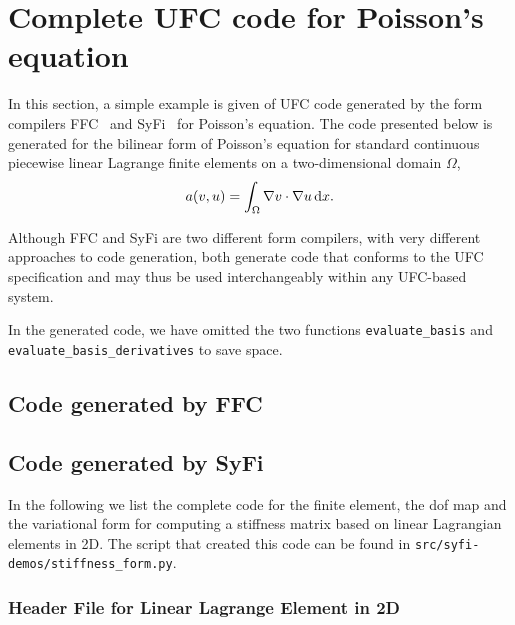 \chapter{Complete UFC code for Poisson's equation}

In this section, a simple example is given of UFC code generated by
the form compilers
FFC~\cite{www:ffc,logg:article:07,logg:article:09,logg:article:10,logg:article:11}
and SyFi~\cite{www:syfi} for Poisson's equation. The code presented
below is generated for the bilinear form of Poisson's equation for
standard continuous piecewise linear Lagrange finite elements on a
two-dimensional domain $\Omega$,
\begin{equation}
  a(v, u) = \int_{\Omega} \nabla v \cdot \nabla u \, \mathrm{d}x.
\end{equation}

Although FFC and SyFi are two different form compilers, with very
different approaches to code generation, both generate code that
conforms to the UFC specification and may thus be used interchangeably
within any UFC-based system.

In the generated code, we have omitted the two functions
\texttt{evaluate\_basis} and
\texttt{evaluate\_basis\_derivatives}\footnotemark{} to save space.


\section{Code generated by FFC}

\scriptsize
{}
\normalsize

\section{Code generated by SyFi}

In the following we list the complete code for the finite element, 
the dof map and the variational form for computing a stiffness matrix
based on linear Lagrangian elements in 2D. 
The script that created this code can be found in \texttt{src/syfi-demos/stiffness\_form.py}. 


\subsection{Header File for Linear Lagrange Element in 2D}

